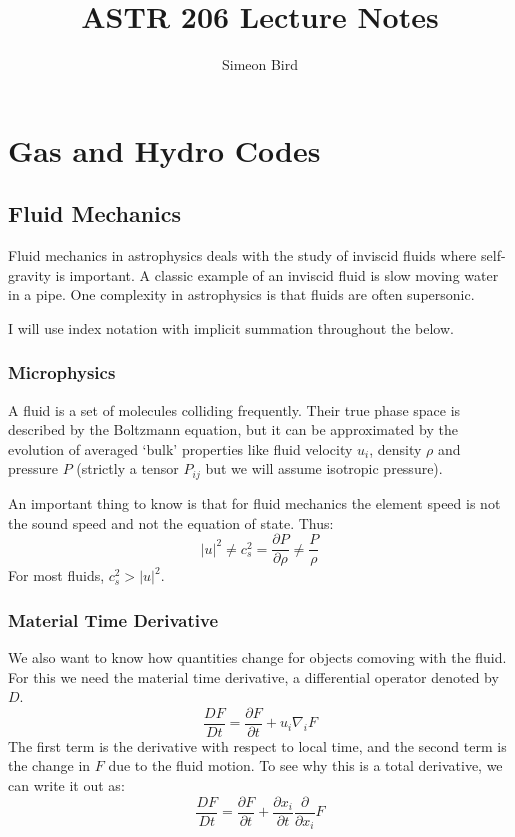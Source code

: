\documentclass[12pt]{article}
\title{ASTR 206 Lecture Notes}
\author{Simeon Bird}
\begin{document}
\maketitle

\section{Gas and Hydro Codes}
\subsection{Fluid Mechanics}

Fluid mechanics in astrophysics deals with the study of inviscid fluids where self-gravity is important. A classic example of an inviscid fluid is slow moving water in a pipe. One complexity in astrophysics is that fluids are often supersonic.

I will use index notation with implicit summation throughout the below.

\subsubsection{Microphysics}

A fluid is a set of molecules colliding frequently. Their true phase space is described by the Boltzmann equation, but it can be approximated by the evolution of averaged `bulk' properties like fluid velocity $u_i$, density $\rho$ and pressure $P$ (strictly a tensor $P_{ij}$ but we will assume isotropic pressure).

An important thing to know is that for fluid mechanics the element speed is not the sound speed and not the equation of state. Thus:
\begin{equation}
 |u|^2 \neq c_s^2 = \frac{\partial P}{\partial \rho} \neq \frac{P}{\rho}
\end{equation}
For most fluids, $c_s^2 > |u|^2$.

\subsubsection{Material Time Derivative}

We also want to know how quantities change for objects comoving with the fluid. For this we need the material time derivative, a differential operator denoted by $D$.
\begin{equation}
\frac{D F}{D t} = \frac{\partial F}{\partial t} + u_i \nabla_i F
\end{equation}
The first term is the derivative with respect to local time, and the second term is the change in $F$ due to the fluid motion. To see why this is a total derivative, we can write it out as:
\begin{equation}
\frac{D F}{D t} = \frac{\partial F}{\partial t} + \frac{\partial x_i}{\partial t}\frac{\partial }{\partial x_i} F
\end{equation}
\end{document}
